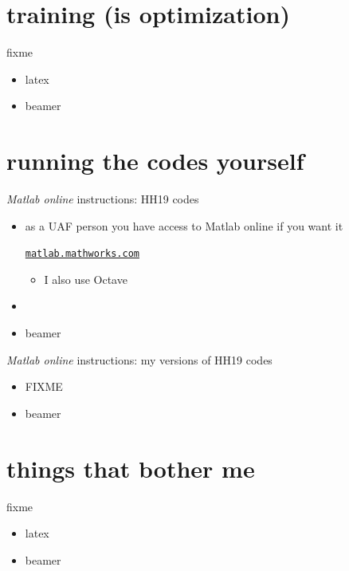 \documentclass[xcolor={svgnames},
               hyperref={colorlinks,citecolor=DeepPink4,linkcolor=FireBrick,urlcolor=Maroon}]
               {beamer}
\begin{document}
\section{training (is optimization)}

\begin{frame}{fixme}

\begin{itemize}
\item latex
\item beamer
\end{itemize}
\end{frame}


\section{running the codes yourself}

\begin{frame}{\emph{Matlab online} instructions: HH19 codes}

\begin{itemize}
\item as a UAF person you have access to Matlab online if you want it

\begin{center}
\href{https://matlab.mathworks.com/}{\texttt{matlab.mathworks.com}}
\end{center}

    \begin{itemize}
    \item I also use Octave
    \end{itemize}
\item 
\item beamer
\end{itemize}
\end{frame}


\begin{frame}{\emph{Matlab online} instructions: my versions of HH19 codes}

\begin{itemize}
\item FIXME
\item beamer
\end{itemize}
\end{frame}


\section{things that bother me}

\begin{frame}{fixme}

\begin{itemize}
\item latex
\item beamer
\end{itemize}
\end{frame}
\end{document}
